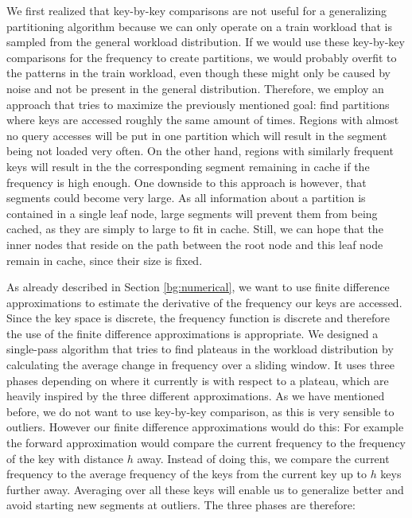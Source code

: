 We first realized that key-by-key comparisons are not useful for a generalizing partitioning algorithm because we can only operate on a train workload that is sampled from the general workload distribution. If we would use these key-by-key comparisons for the frequency to create partitions, we would probably overfit to the patterns in the train workload, even though these might only be caused by noise and not be present in the general distribution. Therefore, we employ an approach that tries to maximize the previously mentioned goal: find partitions where keys are accessed roughly the same amount of times. Regions with almost no query accesses will be put in one partition which will result in the segment being not loaded very often. On the other hand, regions with similarly frequent keys will result in the the corresponding segment remaining in cache if the frequency is high enough. One downside to this approach is however, that segments could become very large. As all information about a partition is contained in a single leaf node, large segments will prevent them from being cached, as they are simply to large to fit in cache. Still, we can hope that the inner nodes that reside on the path between the root node and this leaf node remain in cache, since their size is fixed.

As already described in Section \ref{bg:numerical}, we want to use finite difference approximations to estimate the derivative of the frequency our keys are accessed. Since the key space is discrete, the frequency function is discrete and therefore the use of the finite difference approximations is appropriate. We designed a single-pass algorithm that tries to find plateaus in the workload distribution by calculating the average change in frequency over a sliding window. It uses three phases depending on where it currently is with respect to a plateau, which are heavily inspired by the three different approximations. As we have mentioned before, we do not want to use key-by-key comparison, as this is very sensible to outliers. However our finite difference approximations would do this: For example the forward approximation would compare the current frequency to the frequency of the key with distance $h$ away. Instead of doing this, we compare the current frequency to the average frequency of the keys from the current key up to $h$ keys further away. Averaging over all these keys will enable us to generalize better and avoid starting new segments at outliers. The three phases are therefore:

